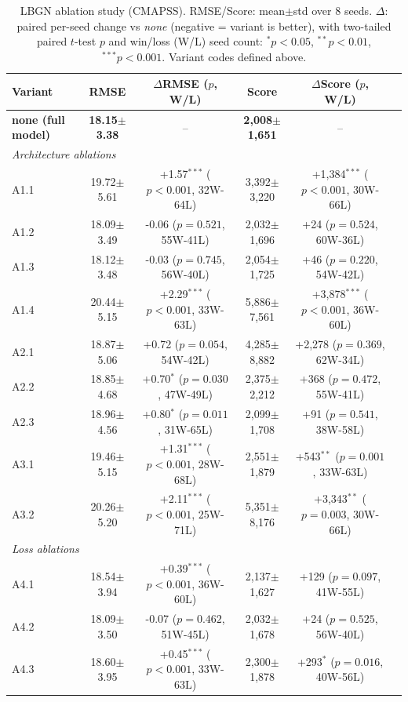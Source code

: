 \begin{table}[t]
\centering
\footnotesize
\caption{LBGN ablation study (CMAPSS). RMSE/Score: mean$\pm$std over 8 seeds. $\Delta$: paired per-seed change vs \textit{none} (negative = variant is better), with two-tailed paired $t$-test $p$ and win/loss (W/L) seed count: $^{*}p{<}0.05$, $^{**}p{<}0.01$, $^{***}p{<}0.001$. Variant codes defined above.}
\label{tab:ablation}
\begin{tabular}{lccccc}
\toprule
Variant & RMSE & $\Delta$RMSE ($p$, W/L) & Score & $\Delta$Score ($p$, W/L) \\
\midrule
\textbf{none (full model)} & \textbf{18.15$\pm$3.38} & -- & \textbf{2,008$\pm$1,651} & -- \\
\midrule
\multicolumn{5}{l}{\textit{Architecture ablations}} \\
A1.1 & 19.72$\pm$5.61 & +1.57$^{***}$ ($p{<}0.001$, 32W-64L) & 3,392$\pm$3,220 & +1,384$^{***}$ ($p{<}0.001$, 30W-66L) \\
A1.2 & 18.09$\pm$3.49 & -0.06 ($p=0.521$, 55W-41L) & 2,032$\pm$1,696 & +24 ($p=0.524$, 60W-36L) \\
A1.3 & 18.12$\pm$3.48 & -0.03 ($p=0.745$, 56W-40L) & 2,054$\pm$1,725 & +46 ($p=0.220$, 54W-42L) \\
A1.4 & 20.44$\pm$5.15 & +2.29$^{***}$ ($p{<}0.001$, 33W-63L) & 5,886$\pm$7,561 & +3,878$^{***}$ ($p{<}0.001$, 36W-60L) \\
A2.1 & 18.87$\pm$5.06 & +0.72 ($p=0.054$, 54W-42L) & 4,285$\pm$8,882 & +2,278 ($p=0.369$, 62W-34L) \\
A2.2 & 18.85$\pm$4.68 & +0.70$^{*}$ ($p=0.030$, 47W-49L) & 2,375$\pm$2,212 & +368 ($p=0.472$, 55W-41L) \\
A2.3 & 18.96$\pm$4.56 & +0.80$^{*}$ ($p=0.011$, 31W-65L) & 2,099$\pm$1,708 & +91 ($p=0.541$, 38W-58L) \\
A3.1 & 19.46$\pm$5.15 & +1.31$^{***}$ ($p{<}0.001$, 28W-68L) & 2,551$\pm$1,879 & +543$^{**}$ ($p=0.001$, 33W-63L) \\
A3.2 & 20.26$\pm$5.20 & +2.11$^{***}$ ($p{<}0.001$, 25W-71L) & 5,351$\pm$8,176 & +3,343$^{**}$ ($p=0.003$, 30W-66L) \\
\midrule
\multicolumn{5}{l}{\textit{Loss ablations}} \\
A4.1 & 18.54$\pm$3.94 & +0.39$^{***}$ ($p{<}0.001$, 36W-60L) & 2,137$\pm$1,627 & +129 ($p=0.097$, 41W-55L) \\
A4.2 & 18.09$\pm$3.50 & -0.07 ($p=0.462$, 51W-45L) & 2,032$\pm$1,678 & +24 ($p=0.525$, 56W-40L) \\
A4.3 & 18.60$\pm$3.95 & +0.45$^{***}$ ($p{<}0.001$, 33W-63L) & 2,300$\pm$1,878 & +293$^{*}$ ($p=0.016$, 40W-56L) \\
\bottomrule
\end{tabular}
\end{table}

